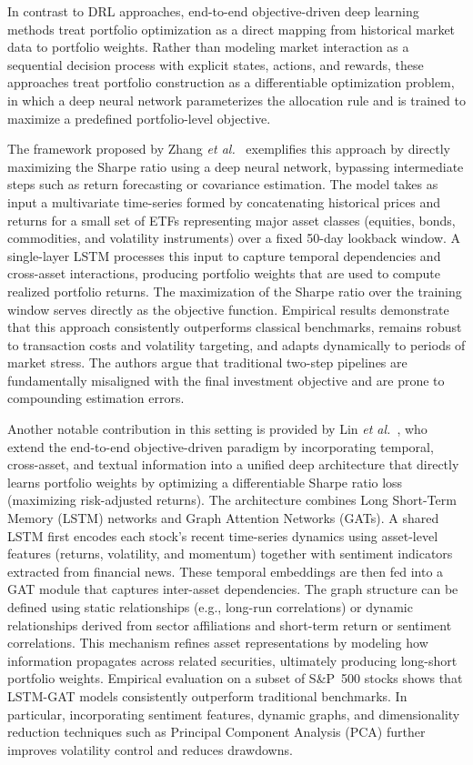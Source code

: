 In contrast to DRL approaches, end-to-end objective-driven deep learning methods treat portfolio optimization as a direct mapping from historical market data to portfolio weights. Rather than modeling market interaction as a sequential decision process with explicit states, actions, and rewards, these approaches treat portfolio construction as a differentiable optimization problem, in which a deep neural network parameterizes the allocation rule and is trained to maximize a predefined portfolio-level objective.

The framework proposed by Zhang \emph{et al.}~\cite{984be} exemplifies this approach by directly maximizing the Sharpe ratio using a deep neural network, bypassing intermediate steps such as return forecasting or covariance estimation. The model takes as input a multivariate time-series formed by concatenating historical prices and returns for a small set of ETFs representing major asset classes (equities, bonds, commodities, and volatility instruments) over a fixed 50-day lookback window. A single-layer LSTM processes this input to capture temporal dependencies and cross-asset interactions, producing portfolio weights that are used to compute realized portfolio returns. The maximization of the Sharpe ratio over the training window serves directly as the objective function. Empirical results demonstrate that this approach consistently outperforms classical benchmarks, remains robust to transaction costs and volatility targeting, and adapts dynamically to periods of market stress. The authors argue that traditional two-step pipelines are fundamentally misaligned with the final investment objective and are prone to compounding estimation errors.

Another notable contribution in this setting is provided by Lin \emph{et al.}~\cite{e6ca3}, who extend the end-to-end objective-driven paradigm by incorporating temporal, cross-asset, and textual information into a unified deep architecture that directly learns portfolio weights by optimizing a differentiable Sharpe ratio loss (maximizing risk-adjusted returns). The architecture combines Long Short-Term Memory (LSTM) networks and Graph Attention Networks (GATs). A shared LSTM first encodes each stock's recent time-series dynamics using asset-level features (returns, volatility, and momentum) together with sentiment indicators extracted from financial news. These temporal embeddings are then fed into a GAT module that captures inter-asset dependencies. The graph structure can be defined using static relationships (e.g., long-run correlations) or dynamic relationships derived from sector affiliations and short-term return or sentiment correlations. This mechanism refines asset representations by modeling how information propagates across related securities, ultimately producing long-short portfolio weights. Empirical evaluation on a subset of S\&P~500 stocks shows that LSTM-GAT models consistently outperform traditional benchmarks. In particular, incorporating sentiment features, dynamic graphs, and dimensionality reduction techniques such as Principal Component Analysis (PCA) further improves volatility control and reduces drawdowns.


